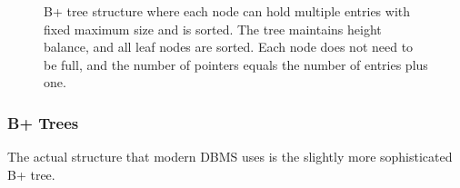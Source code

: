 \begin{definition}[B Tree]
\begin{figure}[H]
        \caption{B+ tree structure where each node can hold multiple entries with fixed maximum size and is sorted. The tree maintains height balance, and all leaf nodes are sorted. Each node does not need to be full, and the number of pointers equals the number of entries plus one.}
        \label{fig:b_tree}
      \end{figure}
    \end{definition}

  \subsubsection{B+ Trees}

    The actual structure that modern DBMS uses is the slightly more sophisticated B+ tree. 


